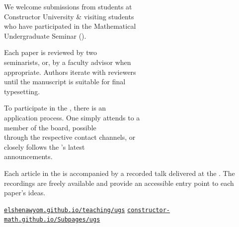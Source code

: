 \hfill
\begin{minipage}[t]{0.47\textwidth}


  \vspace{\internal}

  We welcome submissions from students at\\
  Constructor University \& visiting students\\
  who have participated in the Mathematical\\
  Undergraduate Seminar (\UgS).

  \vspace{\internal}
  
  Each paper is reviewed by two \UgS\\
  seminarists,  or, by a faculty advisor when\\
  appropriate. Authors iterate with reviewers\\
  until the manuscript is suitable for final\\
  typesetting.

  \vspace{\internal}

  To participate in the \UgS, there is an\\
  application process. One simply attends to a\\
  member of the \MSCU board, possible\\
  through the respective contact channels, or\\
  closely follows the \MSCU's latest\\
  announcements.

  \vspace{\external}


  \vspace{\internal}

  Each article in the {} is accompanied by a recorded talk delivered
  at the \UgS. The recordings are freely
  available and provide an accessible entry point to each paper's ideas.

  \vspace{\internal}

  \noindent\href{https://elshenawyom.github.io/teaching/ugs}{\texttt{elshenawyom.github.io/teaching/ugs}}
  \noindent\href{https://constructor-math.github.io/Subpages/ugs}{\texttt{constructor-math.github.io/Subpages/ugs}}


\end{minipage}
